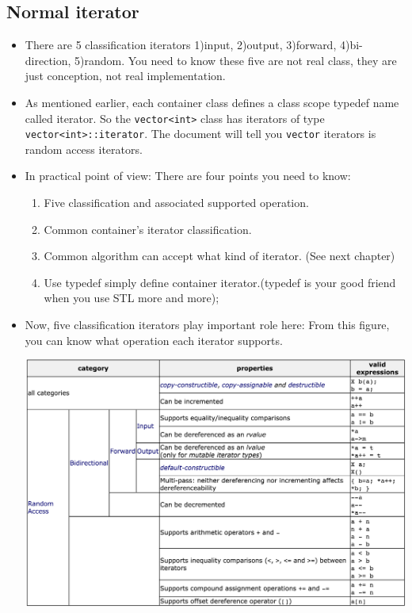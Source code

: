 \documentclass[a4paper,11pt,twoside]{book}
\begin{document}
\subsection{Normal iterator}
\begin{itemize}
\item There are 5 classification iterators 1)input, 2)output, 3)forward, 4)bi-direction, 5)random.
You need to know these five are not real class, they are just conception, not real implementation.

\item As mentioned earlier, each container class defines a class scope typedef name called iterator. So the \texttt{vector<int>} class has iterators of type \texttt{vector<int>::iterator}.  The document will tell you \texttt{vector} iterators is random access iterators.

 \item In practical point of view: There are four points you need to know:
\begin{enumerate}
\item Five classification and associated supported operation.
\item Common container's iterator classification.
\item Common algorithm can accept what kind of iterator. (See next chapter)
\item Use typedef simply define container iterator.(typedef is your good friend when you use STL more and more);
\end{enumerate}

\item Now, five classification iterators play important role here: From this figure, you can know what operation each iterator supports.  \newline
\begin{center}
	  \includegraphics[scale=0.48]{pics/iterator.png}
\end{center}



\end{itemize}
\end{document}
